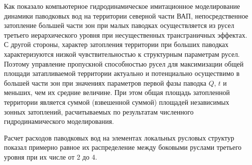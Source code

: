 


\vspace*{-4mm}
Как показало  компьютерное гидродинамическое имитационное моделирование динамики паводковых вод на территории  северной части ВАП, непосредственное затопление большей части зон при малых паводках осуществляется из русел третьего иерархического уровня при несущественных трансграничных эффектах. С другой стороны, характер затопления территории при больших паводках характеризуются низкой чувствительностью к структурным параметрам русел. Поэтому управление пропускной способностью русел для максимизации общей площади затапливаемой территории актуально и потенциально осуществимо в большей части зон при значениях параметров первой фазы паводка $Q$, $t$  и меньших, чем их средние величине. При этом  общая площадь затопленной территории является суммой (взвешенной суммой) площадей независимых зонных затоплений, расчитываемых по результатам численного гидродинамического моделирования.

Расчет расходов паводковых вод на элементах локальных русловых структур показал примерно равное их распределение между боковыми руслами третьего уровня при их числе от 2 до 4.



